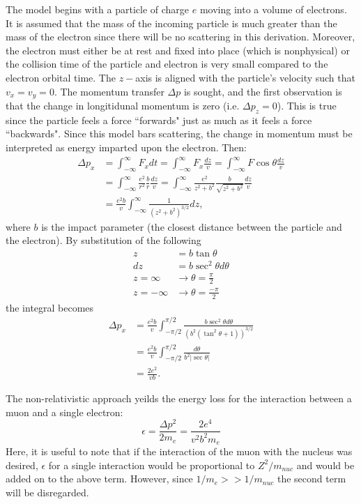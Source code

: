 The model begins with a particle of charge $e$ moving into a volume of electrons. It is assumed that the mass of the incoming particle is much greater than the mass of the electron since there will be no scattering in this derivation. Moreover, the electron must either be at rest and fixed into place (which is nonphysical) or the collision time of the particle and electron is very small compared to the electron orbital time. The $z-$axis is aligned with the particle's velocity such that $v_x=v_y=0$. The momentum transfer $\Delta p$ is sought, and the first observation is that the change in longitidunal momentum is zero (i.e. $\Delta p_z=0$). This is true since the particle feels a force ``forwards" just as much as it feels a force ``backwards". Since this model bars scattering, the change in momentum must be interpreted as energy imparted upon the electron. Then:
\begin{align*}
\Delta p_x &=\int_{-\infty} ^\infty F_x dt = \int_{-\infty} ^{\infty} F_x \frac{dz}{v} = \int_{-\infty} ^{\infty} F\cos{\theta}\frac{dz}{v} \\
&= \int_{-\infty} ^{\infty} \frac{e^2}{r^2} \frac{b}{r} \frac{dz}{v} = \int_{-\infty} ^{\infty} \frac{e^2}{z^2+b^2} \frac{b}{\sqrt{z^2+b^2}} \frac{dz}{v}\\
&= \frac{e^2 b}{v} \int_{-\infty} ^{\infty} \frac{1}{(z^2+b^2)^{3/2}}dz,
\end{align*}
where $b$ is the impact parameter (the closest distance between the particle and the electron). By substitution of the following
\begin{align*}
z &= b\tan{\theta}\\
dz &= b\sec^2{\theta} d\theta\\
z=\infty&\rightarrow \theta = \frac{\pi}{2}\\
z=-\infty&\rightarrow \theta = \frac{-\pi}{2}
\end{align*}
the integral becomes
\begin{align*}
\Delta p_x &=\frac{e^2 b}{v}\int_{-\pi/2} ^{\pi/2} \frac{b\sec^2{\theta} d\theta}{(b^2(\tan^2{\theta}+1))^{3/2}}\\ &=\frac{e^2 b}{v}\int_{-\pi/2} ^{\pi/2} \frac{d\theta}{b^2 |\sec{\theta}|}\\
&=\frac{2e^2}{vb}.
\end{align*}

The non-relativistic approach yeilds the energy loss for the interaction between a muon and a single electron:
\begin{equation}\label{eqn:BetheBlochDeltaE}
\epsilon=\frac{\Delta p^2}{2m_e}=\frac{2e^4}{v^2 b^2 m_e}
\end{equation}
Here, it is useful to note that if the interaction of the muon with the nucleus was desired, $\epsilon$ for a single interaction would be proportional to $Z^2/m_{nuc}$ and would be added on to the above term. However, since $1/m_e >> 1/m_{nuc}$ the second term will be disregarded.

